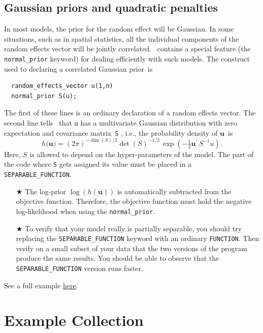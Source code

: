 \documentclass{admbmanual}
\begin{document}
\section{Gaussian priors and quadratic penalties\label{gaussianprior}}

In most models, the
prior for the random effect will be Gaussian. In some situations,
such as in spatial statistics, all the individual components of the random effects vector will be jointly
correlated. \scAB\ contains a special feature (the \texttt{normal\_prior} keyword) for dealing efficiently with such
models. The construct used to declaring a correlated Gaussian prior~is
\begin{lstlisting}
  random_effects_vector u(1,n)
  normal_prior S(u);
\end{lstlisting}
The first of these lines is an ordinary declaration of a random effects vector. The second line tells \scAB\ that
\texttt{u} has a multivariate Gaussian distribution with zero expectation and covariance matrix~\texttt{S} ,
i.e., the probability density of $\mathbf{u}$~is
\[
h(\mathbf{u)=}\left( 2\pi \right) ^{-\dim(S)/2}\det (S)^{-1/2}\,\exp \left( - \tfrac{1}{2}\mathbf{u}^{\prime
} \, S^{-1}u\right) .
\]
Here, $S$ is allowed to depend on the hyper-parameters of the
model. The part of the code where \texttt{S} gets assigned its
value must be placed in a \texttt{SEPARABLE\_FUNCTION}. %
\begin{itemize}
\item[$\bigstar$] The log-prior $\log \left( h\left(
\mathbf{u}\right) \right) $ is automatically subtracted from the
objective function. Therefore, the objective
function must hold the negative log-likelihood when using the
\texttt{normal\_prior}.
\item[$\bigstar$] To verify that your
model really is partially separable, you should try replacing the \texttt{SEPARABLE\_FUNCTION} keyword with an
ordinary \texttt{FUNCTION}. Then verify on a small subset of your data that the two versions of the program
produce the same results. You should be able to observe that the \texttt{SEPARABLE\_FUNCTION} version runs
faster.
\end{itemize}
See a full example \href{http://otter-rsch.com/admbre/examples/spatial/spatial.html}{here}.


\appendix

\chapter{Example Collection}
\label{sec:example_collection}
\end{document}

